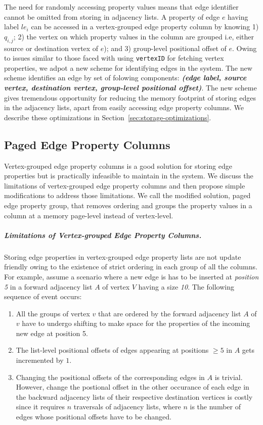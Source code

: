 The need for randomly accessing property values means that edge identifier cannot be omitted from storing in adjacency lists. A property of edge $e$ having label $le_i$ can be accessed in a vertex-grouped edge property column by knowing 1) $q_{i,j}$; 2) the vertex on which property values in the column are grouped i.e, either source or destination vertex of $e$); and 3) group-level positional offset of $e$. Owing to issues similar to those faced with using \texttt{vertexID} for fetching vertex properties, we adpot a new scheme for identifying edges in the system. The new scheme identifies an edge  by set of folowing components: \textbf{\emph{(edge label, source vertex, destination vertex, group-level positional offset)}}. The new scheme gives tremendous opportunity for reducing the memory footprint of storing edges in the adjacency lists, apart from easily accessing edge property columns. We describe these optimizations in Section~\ref{sec:storage-optimizations}.

\subsection{Paged Edge Property Columns}
\label{sec:page-level-edge-property-columns}

Vertex-grouped edge property columns is a good solution for storing edge properties but is practically infeasible to maintain in the system. We discuss the limitations of vertex-grouped edge property columns and then propose simple modifications to address those limitations. We call the modified solution, paged edge property group, that removes ordering and groups the property values in a column at a memory page-level instead of vertex-level.

\vspace{-12pt}
\subparagraph{Limitations of Vertex-grouped Edge Property Columns.}
Storing edge properties in vertex-grouped edge property lists are not update friendly owing to the existence of strict ordering in each group of all the columns. For example, assume a scenario where a new edge is has to be inserted at \emph{position 5} in a forward adjacency list $A$ of vertex $V$ having a size \emph{10}. The following sequence of event occurs: 
\begin{enumerate}
	\item All the groups of vertex $v$ that are ordered by the forward adjacency list $A$ of $v$ have to undergo shifting to make space for the properties of the incoming new edge at position 5.
	\item The list-level positional offsets of edges appearing at positions $\geq 5$ in $A$ gets incremented by $1$. 
	\item Changing the positional offsets of the corresponding edges in $A$ is trivial. However, change the postional offset in the other occurance of each edge in the backward adjacency lists of their respective destination vertices is costly since it requires $n$ traversals of adjacency lists, where $n$ is the number of edges whose positional offsets have to be changed.
\end{enumerate}

